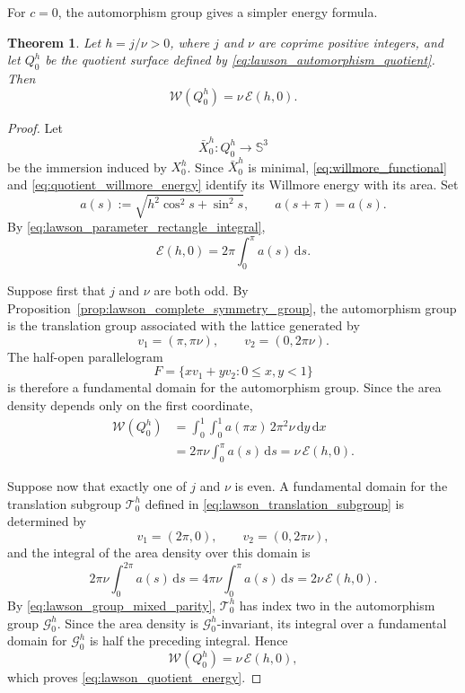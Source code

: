 \documentclass[a4paper,11pt]{amsart}
\numberwithin{equation}{section}
\theoremstyle{plain}
\newtheorem{thm}{Theorem}[section]
\newcommand{\dif}{\mathrm{d}}
\begin{document}
For $c=0$, the automorphism group gives a simpler energy
formula.

\begin{thm}
\label{thm:lawson_quotient_energy}
Let $h=j/\nu>0$, where $j$ and $\nu$ are coprime positive integers, and
let $Q_0^h$ be the quotient surface defined by
\eqref{eq:lawson_automorphism_quotient}. Then
\begin{equation}\label{eq:lawson_quotient_energy}
\mathcal W(Q_0^h)
=
\nu\,\mathcal E(h,0).
\end{equation}
\end{thm}

\begin{proof}
Let
\[
\bar X_0^h:Q_0^h\longrightarrow\mathbb S^3
\]
be the immersion induced by $X_0^h$. Since $\bar X_0^h$ is minimal,
\eqref{eq:willmore_functional} and
\eqref{eq:quotient_willmore_energy} identify its Willmore energy with its
area. Set
\[
a(s):=\sqrt{h^2\cos^2s+\sin^2s},
\qquad
a(s+\pi)=a(s).
\]
By \eqref{eq:lawson_parameter_rectangle_integral},
\[
\mathcal E(h,0)
=
2\pi\int_0^\pi a(s)\,\dif s.
\]

Suppose first that $j$ and $\nu$ are both odd. By
Proposition~\ref{prop:lawson_complete_symmetry_group}, the
automorphism group is the translation group associated with the lattice
generated by
\[
v_1=(\pi,\pi\nu),
\qquad
v_2=(0,2\pi\nu).
\]
The half-open parallelogram
\[
F=\{xv_1+yv_2:0\le x,y<1\}
\]
is therefore a fundamental domain for the automorphism group. Since
the area density depends only on the first coordinate,
\[
\begin{aligned}
\mathcal W(Q_0^h)
&=
\int_0^1\int_0^1 a(\pi x)\,2\pi^2\nu\,\dif y\,\dif x\\
&=
2\pi\nu\int_0^\pi a(s)\,\dif s
=
\nu\,\mathcal E(h,0).
\end{aligned}
\]

Suppose now that exactly one of $j$ and $\nu$ is even. A fundamental
domain for the translation subgroup $\mathcal T_0^h$ defined in
\eqref{eq:lawson_translation_subgroup} is determined by
\[
v_1=(2\pi,0),
\qquad
v_2=(0,2\pi\nu),
\]
and the integral of the area density over this domain is
\[
2\pi\nu\int_0^{2\pi}a(s)\,\dif s
=
4\pi\nu\int_0^\pi a(s)\,\dif s
=
2\nu\,\mathcal E(h,0).
\]
By \eqref{eq:lawson_group_mixed_parity},
$\mathcal T_0^h$ has index two in the automorphism group
$\mathcal G_0^h$. Since the area density is
$\mathcal G_0^h$-invariant, its integral over a fundamental domain for
$\mathcal G_0^h$ is half the preceding integral. Hence
\[
\mathcal W(Q_0^h)
=
\nu\,\mathcal E(h,0),
\]
which proves \eqref{eq:lawson_quotient_energy}.
\end{proof}
\end{document}
